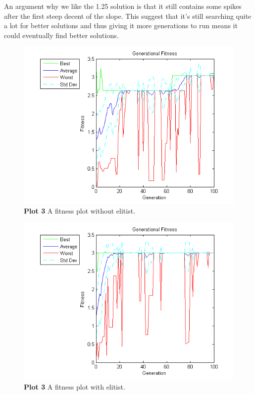 \documentclass[a4paper]{article}
\begin{document}
An argument why we like the 1.25 solution is that it still contains some spikes after the first steep decent of the slope. This suggest that it's still searching quite a lot for better solutions and thus giving it more generations to run means it could eventually find better solutions.


\begin{figure}[H] %
	\includegraphics[scale=0.7]{fitness-non-elitist.png}
	\caption{\label{fig:plot3nonelitist}\textbf{Plot 3} A fitness plot without elitist. }
\end{figure}
\begin{figure}[H] %
	\includegraphics[scale=0.7]{fitness-elitist.png}
	\caption{\label{fig:plot3elitist}\textbf{Plot 3} A fitness plot with elitist. }
\end{figure}
\end{document}
